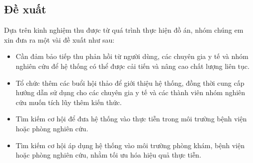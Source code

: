 \subsection*{Đề xuất}


Dựa trên kinh nghiệm thu được từ quá trình thực hiện đồ án, nhóm chúng em xin đưa ra một vài đề xuất như sau:

\begin{adjustwidth}{1.5em}{}
	\begin{itemize}
		\item Cần đảm bảo tiếp thu phản hồi từ người dùng, các chuyên gia y tế và nhóm nghiên cứu để hệ thống có thể được cải tiến và nâng cao chất lượng liên tục.

		\item Tổ chức thêm các buổi hội thảo để giới thiệu hệ thống, đồng thời cung cấp hướng dẫn sử dụng cho các chuyên gia y tế và các thành viên nhóm nghiên cứu muốn tích lũy thêm kiến thức.

		\item Tìm kiếm cơ hội để đưa hệ thống vào thực tiễn trong môi trường bệnh viện hoặc phòng nghiên cứu.
		
		\item Tìm kiếm cơ hội áp dụng hệ thống vào môi trường phòng khám, bệnh viện hoặc phòng nghiên cứu, nhằm tối ưu hóa hiệu quả thực tiễn.

	\end{itemize}
\end{adjustwidth}



\cleardoublepage
